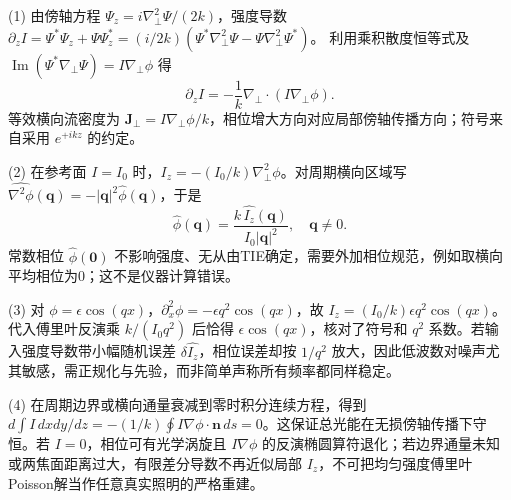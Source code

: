 (1) 由傍轴方程
\(\Psi_z=i\nabla_\perp^2\Psi/(2k)\)，强度导数
\(\partial_zI=\Psi^*\Psi_z+\Psi\Psi_z^*
=(i/2k)(\Psi^*\nabla_\perp^2\Psi-\Psi\nabla_\perp^2\Psi^*)\)。
利用乘积散度恒等式及 \(\operatorname{Im}(\Psi^*\nabla_\perp\Psi)=I\nabla_\perp\phi\) 得
\[
\boxed{\partial_zI=-\frac1k\nabla_\perp\cdot(I\nabla_\perp\phi)}.
\]
等效横向流密度为 \(\boldsymbol J_\perp=I\nabla_\perp\phi/k\)，相位增大方向对应局部傍轴传播方向；符号来自采用 \(e^{+ikz}\) 的约定。

(2) 在参考面 \(I=I_0\) 时，\(I_z=-(I_0/k)\nabla_\perp^2\phi\)。对周期横向区域写 \(\widehat{\nabla^2\phi}(\boldsymbol q)=-|\boldsymbol q|^2\widehat\phi(\boldsymbol q)\)，于是
\[
\boxed{\widehat\phi(\boldsymbol q)=\frac{k\,\widehat{I_z}(\boldsymbol q)}{I_0|\boldsymbol q|^2}},\quad\boldsymbol q\ne0.
\]
常数相位 \(\widehat\phi(\boldsymbol0)\) 不影响强度、无从由TIE确定，需要外加相位规范，例如取横向平均相位为0；这不是仪器计算错误。

(3) 对 \(\phi=\epsilon\cos(qx)\)，\(\partial_x^2\phi=-\epsilon q^2\cos(qx)\)，故
\(I_z=(I_0/k)\epsilon q^2\cos(qx)\)。代入傅里叶反演乘 \(k/(I_0q^2)\) 后恰得 \(\epsilon\cos(qx)\)，核对了符号和 \(q^2\) 系数。若输入强度导数带小幅随机误差 \(\delta\widehat{I_z}\)，相位误差却按 \(1/q^2\) 放大，因此低波数对噪声尤其敏感，需正规化与先验，而非简单声称所有频率都同样稳定。

(4) 在周期边界或横向通量衰减到零时积分连续方程，得到 \(d\int I\,dxdy/dz=-(1/k)\oint I\nabla\phi\cdot\boldsymbol n\,ds=0\)。这保证总光能在无损傍轴传播下守恒。若 \(I=0\)，相位可有光学涡旋且 \(I\nabla\phi\) 的反演椭圆算符退化；若边界通量未知或两焦面距离过大，有限差分导数不再近似局部 \(I_z\)，不可把均匀强度傅里叶Poisson解当作任意真实照明的严格重建。
